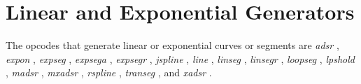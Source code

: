 \begin{comment}
\documentclass[10pt]{article}
\usepackage{fullpage, graphicx, url}
\setlength{\parskip}{1ex}
\setlength{\parindent}{0ex}
\title{Linear and Exponential Generators}



\begin{tabular}{ccc}
The Alternative Csound Reference Manual & & \\
Previous &Signal Generators &Next

\end{tabular}

\end{comment}
\section{Linear and Exponential Generators}


  The opcodes that generate linear or exponential curves or segments are \emph{adsr}
, \emph{expon}
, \emph{expseg}
, \emph{expsega}
, \emph{expsegr}
, \emph{jspline}
, \emph{line}
, \emph{linseg}
, \emph{linsegr}
, \emph{loopseg}
, \emph{lpshold}
, \emph{madsr}
, \emph{mxadsr}
, \emph{rspline}
, \emph{transeg}
, and \emph{xadsr}
. 


\begin{comment}
\begin{tabular}{lcr}
Previous &Home &Next \\
Granular Synthesis &Up &Linear Predictive Coding (LPC) Resynthesis

\end{tabular}



\end{comment}
